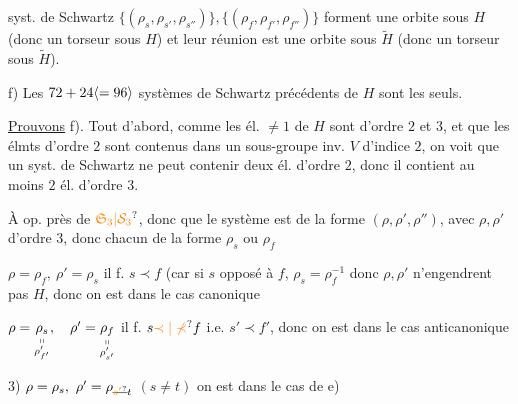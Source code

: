 
  syst. de Schwartz $\{(\rho_s,\rho_{s'},\rho_{s''})\},\{(\rho_f,\rho_{f'},\rho_{f''})\}$ forment  une orbite sous $H$ (donc un torseur sous $H$) et leur réunion est une orbite sous $\widetilde H$ (donc un torseur sous $\widetilde H$).


f) Les $72+24\inserted{=96}$ systèmes de Schwartz précédents de  $H$ sont les seuls.


\uline{Prouvons} f). Tout d'abord, comme les él. $\ne1$ de $H$ sont d'ordre $2$ et $3$, et que les élmts d'ordre $2$ sont contenus dans un sous-groupe inv. $V$ d'indice $2$, on voit que un syst. de Schwartz ne peut contenir deux él. d'ordre $2$, donc il contient au moins $2$ él. d'ordre $3$. 


À  op. près de $\unsure{\mathfrak S_3|\mathcal S_3}$,  donc que le système est de la forme $(\rho,\rho',\rho'')$, avec $\rho,\rho'$ d'ordre $3$, donc chacun de la forme $\rho_s$ ou $\rho_f$

 $\rho=\rho_f,\ \rho'=\rho_s$ il f. $s\prec f$ (car si $s$ opposé à $f$, $\rho_s=\rho_f^{-1}$ donc $\rho,\rho'$ n'engendrent pas $H$, donc on est dans le cas canonique


 $\rho=\underset{\substack{\shortparallel\\\rho'_{f'}}}{\rho_s},\quad\rho'=\underset{\substack{\shortparallel\\\rho'_{s'}}}{\rho_f}$ il f. $s\unsure{\prec|\nprec} f$ i.e. $s'\prec f'$, donc on est dans le cas anticanonique


3) $\rho=\rho_s,\ \rho'=\rho_{\deleted{\unsure{s'}}t}$  $(s\ne t)$ on est dans le  cas de e)


